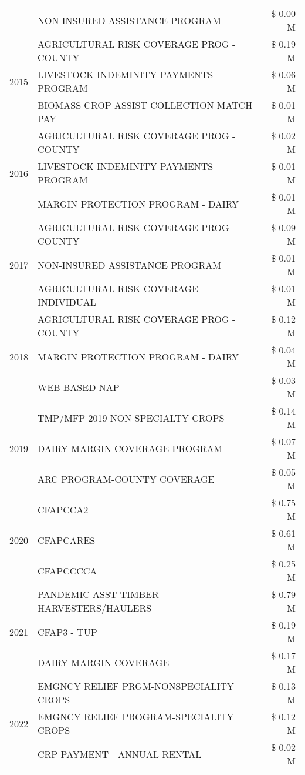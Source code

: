 \begin{tabular}{llr}
 & NON-INSURED ASSISTANCE PROGRAM & \$ 0.00 M \\
\cline{1-3}
\multirow[t]{3}{*}{2015} & AGRICULTURAL RISK COVERAGE PROG - COUNTY & \$ 0.19 M \\
 & LIVESTOCK INDEMINITY PAYMENTS PROGRAM & \$ 0.06 M \\
 & BIOMASS CROP ASSIST COLLECTION MATCH PAY & \$ 0.01 M \\
\cline{1-3}
\multirow[t]{3}{*}{2016} & AGRICULTURAL RISK COVERAGE PROG - COUNTY & \$ 0.02 M \\
 & LIVESTOCK INDEMINITY PAYMENTS PROGRAM & \$ 0.01 M \\
 & MARGIN PROTECTION PROGRAM - DAIRY & \$ 0.01 M \\
\cline{1-3}
\multirow[t]{3}{*}{2017} & AGRICULTURAL RISK COVERAGE PROG - COUNTY & \$ 0.09 M \\
 & NON-INSURED ASSISTANCE PROGRAM & \$ 0.01 M \\
 & AGRICULTURAL RISK COVERAGE - INDIVIDUAL & \$ 0.01 M \\
\cline{1-3}
\multirow[t]{3}{*}{2018} & AGRICULTURAL RISK COVERAGE PROG - COUNTY & \$ 0.12 M \\
 & MARGIN PROTECTION PROGRAM - DAIRY & \$ 0.04 M \\
 & WEB-BASED NAP & \$ 0.03 M \\
\cline{1-3}
\multirow[t]{3}{*}{2019} & TMP/MFP 2019 NON SPECIALTY CROPS & \$ 0.14 M \\
 & DAIRY MARGIN COVERAGE PROGRAM & \$ 0.07 M \\
 & ARC PROGRAM-COUNTY COVERAGE & \$ 0.05 M \\
\cline{1-3}
\multirow[t]{3}{*}{2020} & CFAPCCA2 & \$ 0.75 M \\
 & CFAPCARES & \$ 0.61 M \\
 & CFAPCCCCA & \$ 0.25 M \\
\cline{1-3}
\multirow[t]{3}{*}{2021} & PANDEMIC ASST-TIMBER HARVESTERS/HAULERS & \$ 0.79 M \\
 & CFAP3 - TUP & \$ 0.19 M \\
 & DAIRY MARGIN COVERAGE & \$ 0.17 M \\
\cline{1-3}
\multirow[t]{3}{*}{2022} & EMGNCY RELIEF PRGM-NONSPECIALITY CROPS & \$ 0.13 M \\
 & EMGNCY RELIEF PROGRAM-SPECIALITY CROPS & \$ 0.12 M \\
 & CRP PAYMENT - ANNUAL RENTAL & \$ 0.02 M \\
\cline{1-3}
\bottomrule
\end{tabular}
